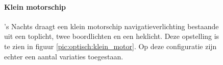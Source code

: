 \begin{figure}[H]
	\centering
	\begin{minipage}[t]{0.50\textwidth}
		\paragraph{Klein motorschip}
		's Nachts draagt een klein motorschip navigatieverlichting bestaande uit een toplicht, twee boordlichten en een heklicht. Deze opstelling is te zien in figuur \ref{pic:optisch:klein_motor}. Op deze configuratie zijn echter een aantal variaties toegestaan.		
	\end{minipage}
	\hfill
	\begin{minipage}[t]{0.22\textwidth}
		\RemoveLine
		\caption{}
		\label{pic:optisch:klein_motor}
	\end{minipage}
	\hfill
	\begin{minipage}[t]{0.22\textwidth}
		\RemoveLine
		\caption{}
		\label{pic:optisch:klein_motor2}
	\end{minipage}
\end{figure}
